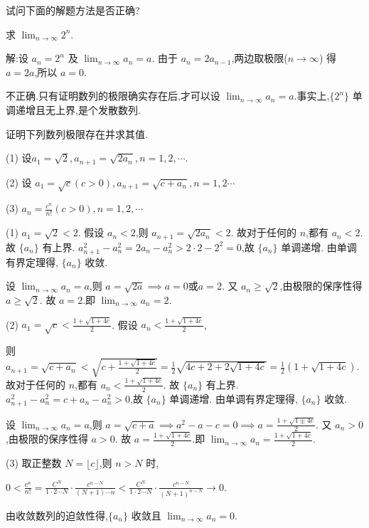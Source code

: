 \begin{practice}
    试问下面的解题方法是否正确?

    求 $\lim_{n \to \infty} 2^n$.

    解:设 $a_n=2^n$ 及 $\lim_{n \to \infty} a_n=a$. 由于 $a_n=2a_{n-1}$,两边取极限($n\to\infty$) 得 $a=2a$,所以 $a=0$.
\end{practice}

\begin{solve}
    不正确.只有证明数列的极限确实存在后,才可以设 $\lim_{n \to \infty} a_n=a$.事实上,$\{2^n\}$ 单调递增且无上界,是个发散数列.
\end{solve}

\begin{practice}
    证明下列数列极限存在并求其值.

    (1) 设$a_1=\sqrt{2},a_{n+1}=\sqrt{2a_n},n=1,2,\cdots$.

    (2) 设 $a_1=\sqrt{c}(c>0),a_{n+1}=\sqrt{c+a_n},n=1,2\cdots$

    (3) $a_n=\frac{c^n}{n!}(c>0),n=1,2,\cdots$
\end{practice}

\begin{solve}
    (1) $a_1=\sqrt{2}<2$. 假设 $a_n<2$,则 $a_{n+1}=\sqrt{2a_n}<2$. 故对于任何的 $n$,都有 $a_n<2$. 故 $\{a_n\}$ 有上界. $a_{n+1}^2-a_n^2=2a_n-a_n^2>2\cdot 2-2^2=0 $,故 $\{a_n\}$ 单调递增. 由单调有界定理得, $\{a_n\}$ 收敛.

    设 $\lim_{n\to\infty} a_n=a$,则 $a=\sqrt{2a}\implies a=0\text{或}a=2$. 又 $a_n\ge \sqrt{2}$,由极限的保序性得 $a\ge \sqrt{2}$. 故 $a=2$.即 $\lim_{n\to\infty} a_n=2$.

    (2) $a_1=\sqrt{c}<\frac{1+\sqrt{1+4c}}{2}$. 假设 $a_n<\frac{1+\sqrt{1+4c}}{2}$,
    
    则 $a_{n+1}=\sqrt{c+a_n}<\sqrt{c+\frac{1+\sqrt{1+4c}}{2}}=\frac{1}{2}\sqrt{4c+2+2\sqrt{1+4c}}=\frac{1}{2}(1+\sqrt{1+4c})$. 故对于任何的 $n$,都有 $a_n<\frac{1+\sqrt{1+4c}}{2}$. 故 $\{a_n\}$ 有上界. $a_{n+1}^2-a_n^2=c+a_n-a_n^2>0 $,故 $\{a_n\}$ 单调递增. 由单调有界定理得, $\{a_n\}$ 收敛.

    设 $\lim_{n\to\infty} a_n=a$,则 $a=\sqrt{c+a}\implies a^2-a-c=0\implies a=\frac{1+\sqrt{1\pm 4c}}{2}$. 又 $a_n>0$,由极限的保序性得 $a>0$. 故 $a=\frac{1+\sqrt{1+4c}}{2}$.即 $\lim_{n\to\infty} a_n=\frac{1+\sqrt{1+4c}}{2}$.

    (3) 取正整数 $N=\lfloor c \rfloor$,则 $n>N$ 时,

    $0<\frac{c^n}{n!}=\frac{C^N}{1\cdot 2\cdots N}\cdot \frac{c^{n-N}}{(N+1)\cdots n}<\frac{C^N}{1\cdot 2\cdots N}\cdot \frac{c^{n-N}}{(N+1)^{n-N}}\to 0$. 
    
    由收敛数列的迫敛性得,$\{a_n\}$ 收敛且 $\lim_{n\to\infty} a_n=0$.
\end{solve}

